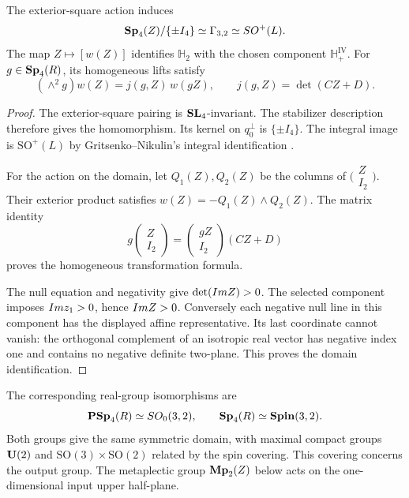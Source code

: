 \begin{theorem}
\label{thm:exceptional-iso}
The exterior-square action induces
\[
 \mathbf{Sp}_4(Z)/\{\pm I_4\}
 \simeq\Gamma_{3,2}
 \simeq SO^+(L).
\]
The map \(Z\mapsto[w(Z)]\) identifies \(\mathbb H_2\)
with the chosen component \(\mathbb H^{\mathrm{IV}}_+\).
For \(g\in\mathbf{Sp}_4(R)\), its homogeneous lifts satisfy
\[
 (\wedge^2g)w(Z)=j(g,Z)\,w(gZ),
 \qquad j(g,Z)=\det(CZ+D).
\]
\end{theorem}

\begin{proof}
The exterior-square pairing is \(\mathbf{SL}_4\)-invariant.
The stabilizer description therefore gives the homomorphism.
Its kernel on \(q_0^\perp\) is \(\{\pm I_4\}\).
The integral image is \(\mathrm{SO}^+(L)\)
by Gritsenko--Nikulin's integral identification
\cite[Lemma 1.1]{GN}.

For the action on the domain, let \(Q_1(Z),Q_2(Z)\) be the columns
of \(\bigl(\begin{smallmatrix}Z\\I_2\end{smallmatrix}\bigr)\).
Their exterior product satisfies
\(w(Z)=-Q_1(Z)\wedge Q_2(Z)\).
The matrix identity
\[
 g\begin{pmatrix}Z\\I_2\end{pmatrix}
 =\begin{pmatrix}gZ\\I_2\end{pmatrix}(CZ+D)
\]
proves the homogeneous transformation formula.

The null equation and negativity give
\(\det(Im Z)>0\).  The selected component imposes
\(Im z_1>0\), hence \(Im Z>0\).
Conversely each negative null line in this component has the
displayed affine representative.  Its last coordinate cannot vanish:
the orthogonal complement of an isotropic real vector has negative
index one and contains no negative definite two-plane.
This proves the domain identification.
\end{proof}

The corresponding real-group isomorphisms are
\cite[Chapter VI, Problems 25--27]{KNAPP:1}
\[
 \mathbf{PSp}_4(R)\simeq SO_0(3,2),\qquad
 \mathbf{Sp}_4(R)\simeq\mathbf{Spin}(3,2).
\]
Both groups give the same symmetric domain, with maximal compact
groups \(\mathbf{U}(2)\) and \(\mathrm{SO}(3)\times\mathrm{SO}(2)\)
related by the spin covering.  This covering concerns the output
group.  The metaplectic group \(\mathbf{Mp}_2(Z)\) below acts on the
one-dimensional input upper half-plane.

